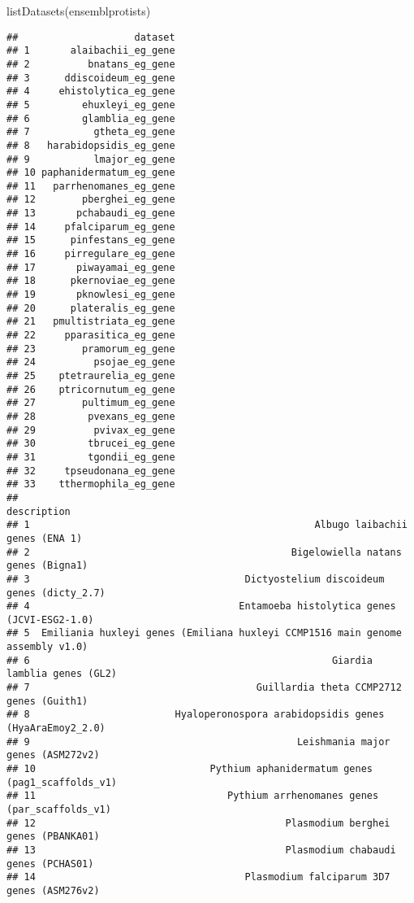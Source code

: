 \documentclass[
]{book}
\newenvironment{Shaded}{\begin{snugshade}}{\end{snugshade}}
\newcommand{\FunctionTok}[1]{\textcolor[rgb]{0.00,0.00,0.00}{#1}}
\newcommand{\NormalTok}[1]{#1}
\begin{document}
\begin{Shaded}
\begin{Highlighting}[]
\FunctionTok{listDatasets}\NormalTok{(ensemblprotists)}
\end{Highlighting}
\end{Shaded}

\begin{verbatim}
##                    dataset
## 1       alaibachii_eg_gene
## 2          bnatans_eg_gene
## 3      ddiscoideum_eg_gene
## 4     ehistolytica_eg_gene
## 5         ehuxleyi_eg_gene
## 6         glamblia_eg_gene
## 7           gtheta_eg_gene
## 8   harabidopsidis_eg_gene
## 9           lmajor_eg_gene
## 10 paphanidermatum_eg_gene
## 11   parrhenomanes_eg_gene
## 12        pberghei_eg_gene
## 13       pchabaudi_eg_gene
## 14     pfalciparum_eg_gene
## 15      pinfestans_eg_gene
## 16     pirregulare_eg_gene
## 17       piwayamai_eg_gene
## 18      pkernoviae_eg_gene
## 19       pknowlesi_eg_gene
## 20      plateralis_eg_gene
## 21   pmultistriata_eg_gene
## 22     pparasitica_eg_gene
## 23        pramorum_eg_gene
## 24          psojae_eg_gene
## 25    ptetraurelia_eg_gene
## 26    ptricornutum_eg_gene
## 27        pultimum_eg_gene
## 28         pvexans_eg_gene
## 29          pvivax_eg_gene
## 30         tbrucei_eg_gene
## 31         tgondii_eg_gene
## 32     tpseudonana_eg_gene
## 33    tthermophila_eg_gene
##                                                                      description
## 1                                                 Albugo laibachii genes (ENA 1)
## 2                                             Bigelowiella natans genes (Bigna1)
## 3                                     Dictyostelium discoideum genes (dicty_2.7)
## 4                                    Entamoeba histolytica genes (JCVI-ESG2-1.0)
## 5  Emiliania huxleyi genes (Emiliana huxleyi CCMP1516 main genome assembly v1.0)
## 6                                                    Giardia lamblia genes (GL2)
## 7                                       Guillardia theta CCMP2712 genes (Guith1)
## 8                         Hyaloperonospora arabidopsidis genes (HyaAraEmoy2_2.0)
## 9                                              Leishmania major genes (ASM272v2)
## 10                              Pythium aphanidermatum genes (pag1_scaffolds_v1)
## 11                                 Pythium arrhenomanes genes (par_scaffolds_v1)
## 12                                           Plasmodium berghei genes (PBANKA01)
## 13                                           Plasmodium chabaudi genes (PCHAS01)
## 14                                    Plasmodium falciparum 3D7 genes (ASM276v2)

\end{verbatim}
\end{document}
